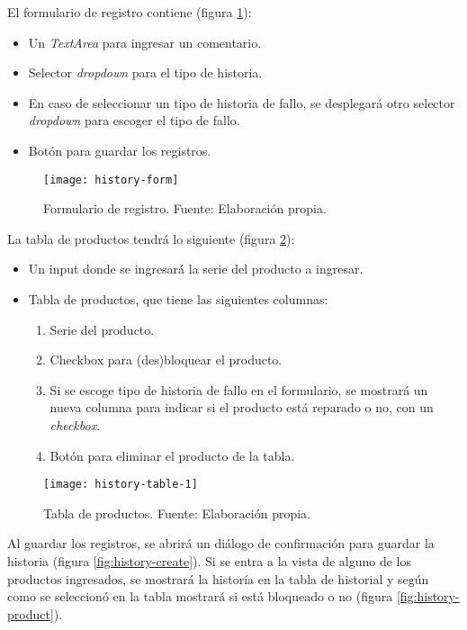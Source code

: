 El formulario de registro contiene (figura \ref{fig:history-form}):
\begin{itemize}
    \item Un \textit{TextArea} para ingresar un comentario.
    \item Selector \textit{dropdown} para el tipo de historia.
    \item En caso de seleccionar un tipo de historia de fallo, se desplegará otro selector \textit{dropdown} para escoger el tipo de fallo.
    \item Botón para guardar los registros.
\end{itemize}

\begin{figure}[H]
	\centering
	\texttt{[image: history-form]}
	\caption{\label{fig:history-form} Formulario de registro. Fuente: Elaboración propia.}
\end{figure}

La tabla de productos tendrá lo siguiente (figura \ref{fig:history-table-1}):

\begin{itemize}
    \item Un input donde se ingresará la serie del producto a ingresar.
    \item Tabla de productos, que tiene las siguientes columnas:
    \begin{enumerate}
        \item Serie del producto.
        \item Checkbox para (des)bloquear el producto.
        \item Si se escoge tipo de historia de fallo en el formulario, se mostrará un nueva columna para indicar si el producto está reparado o no, con un \textit{checkbox}.
        \item Botón para eliminar el producto de la tabla.
    \end{enumerate}    
\end{itemize}

\begin{figure}[H]
	\centering
	\texttt{[image: history-table-1]}
	\caption{\label{fig:history-table-1} Tabla de productos. Fuente: Elaboración propia.}
\end{figure}

Al guardar los registros, se abrirá un diálogo de confirmación para guardar la historia (figura \ref{fig:history-create}). Si se entra a la vista de alguno de los productos ingresados, se mostrará la historía en la tabla de historial y según como se seleccionó en la tabla mostrará si está bloqueado o no (figura \ref{fig:history-product}).


